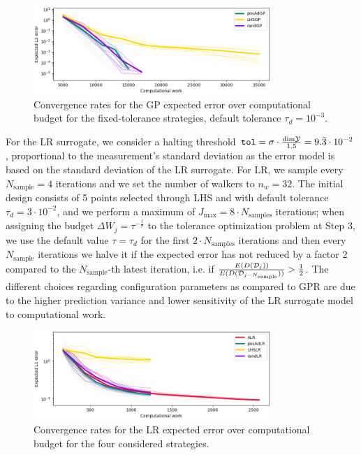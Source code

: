 \begin{figure}[H]
\begin{center}
    \includegraphics[width=0.8\textwidth]{results/pictures/d3/config_dtol0.001/GP_res.png}
\end{center}
\caption{Convergence rates for the GP expected error over computational budget for the fixed-tolerance strategies, default tolerance $\tau_d = 10^{-3}$.}
\label{fig:3dGP-other}
\end{figure}

For the LR surrogate, we consider a halting threshold $\texttt{tol} = \sigma \cdot \frac{\text{dim} \mathcal Y }{1.5} = 9.\bar 3 \cdot 10^{-2}$, proportional to the measurement's standard deviation as the error model is based on the standard deviation of the LR surrogate.
For LR, we sample every $N_{\text{sample}} = 4$ iterations and we set the number of walkers to $n_w = 32$.
The initial design consists of 5 points selected through LHS and with default tolerance $\tau_d = 3 \cdot 10^{-2}$, and we perform a maximum of $J_{\max} = 8 \cdot N_{\text{samples}}$ iterations; when assigning the budget $\Delta W_j = \tau ^{-\frac{l}{r}}$ to the tolerance optimization problem at Step 3, we use the default value $\tau= \tau_d$ for the first $2\cdot N_{\text{samples}}$ iterations and then every $N_{\text{sample}}$ iterations we halve it if the expected error has not reduced by a factor 2 compared to the $N_{\text{sample}}$-th latest iteration, i.e. if $\frac{E(D(\mathcal D_j))}{E(D(\mathcal D_{j-N_{\text{sample}}}))} > \frac{1}{2}$.
The different choices regarding configuration parameters as compared to GPR are due to the higher prediction variance and lower sensitivity of the LR surrogate model to computational work. 

\begin{figure}[H]
\begin{center}
    \includegraphics[width=0.8\textwidth]{results/pictures/d3/LR_res.png}
\end{center}
\caption{Convergence rates for the LR expected error over computational budget for the four considered strategies.}
\label{fig:3dLRconv}
\end{figure}


